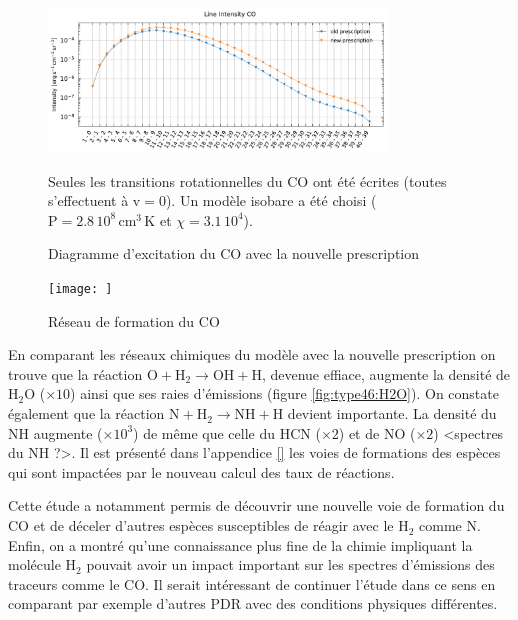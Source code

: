 \begin{figure}[!h]
    \centering \includegraphics[trim = {0 0 0 1cm},clip,width=0.8\textwidth]{figure/type46/I_comp_CO.pdf}
    \caption{Diagramme d'excitation du $\mathrm{CO}$ avec la nouvelle prescription}
    \begin{minipage}{\textwidth}
    Seules les transitions rotationnelles du $\mathrm{CO}$ ont été écrites (toutes s'effectuent à $\mathrm{v}=0$). Un modèle isobare a été choisi ($\mathrm{P} = 2.8\,10^{8} \,\mathrm{cm}^3\,\mathrm{K}$ et $\chi = 3.1\, 10^4$).
    \end{minipage}
    \label{fig:type46:CO}
\end{figure}

\begin{figure}[!h]
    \centering \texttt{[image: ]}
    \caption{Réseau de formation du $\mathrm{CO}$}
    \begin{minipage}{\textwidth}
    
    \end{minipage}
    \label{fig:type46:form:CO}
\end{figure}

En comparant les réseaux chimiques du modèle avec la nouvelle prescription on trouve que la réaction $\mathrm{O} + \mathrm{H}_2 \rightarrow \mathrm{OH} +  \mathrm{H}$, devenue effiace, augmente la densité de $\mathrm{H}_2\mathrm{O}$ ($\times 10$) ainsi que ses raies d'émissions (figure \ref{fig:type46:H2O}). On constate également que la réaction $\mathrm{N} + \mathrm{H}_2 \rightarrow  \mathrm{NH} +  \mathrm{H}$ devient importante. La densité du $\mathrm{NH}$ augmente ($\times 10^3$) de même que celle du $\mathrm{HCN}$ ($\times 2$) et de $\mathrm{NO}$ ($\times 2$) <spectres du $\mathrm{NH}$ ?>. Il est présenté dans l'appendice \ref{} les voies de formations des espèces qui sont impactées par le nouveau calcul des taux de réactions.\newline 

Cette étude a notamment permis de découvrir une nouvelle voie de formation du $\mathrm{CO}$ et de déceler d'autres espèces susceptibles de réagir avec le $\mathrm{H}_2$ comme $\mathrm{N}$. Enfin, on a montré qu'une connaissance plus fine de la chimie impliquant la molécule $\mathrm{H}_2$ pouvait avoir un impact important sur les spectres d'émissions des traceurs comme le $\mathrm{CO}$. Il serait intéressant de continuer l'étude dans ce sens en comparant par exemple d'autres PDR avec des conditions physiques différentes.
